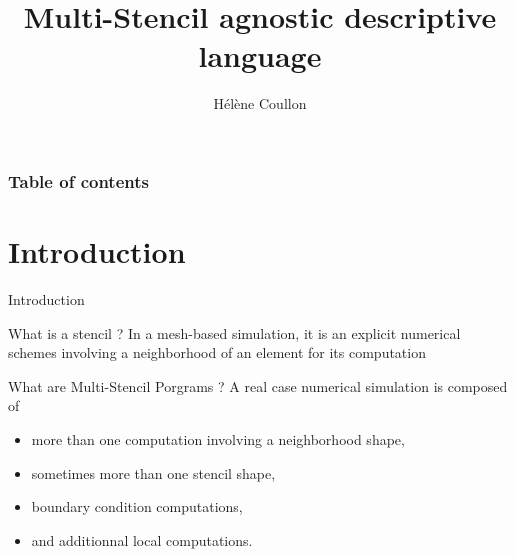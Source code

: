 \documentclass{beamer}
\title{Multi-Stencil agnostic descriptive language}
\author{Hélène Coullon}
\institute{INRIA}
\begin{document}
\begin{frame}
    \titlepage
\end{frame}

\begin{frame}
\frametitle{Table of contents}
    \tableofcontents[hideallsubsections]
\end{frame}

\section{Introduction}
\begin{frame}{Introduction}
\begin{block}{What is a stencil ?}
In a mesh-based simulation, it is an explicit numerical schemes involving a neighborhood of an element for its computation
\end{block}

\begin{block}{What are Multi-Stencil Porgrams ?}
A real case numerical simulation is composed of
\begin{itemize}
\item more than one computation involving a neighborhood shape,
\item sometimes more than one stencil shape,
\item boundary condition computations,
\item and additionnal local computations.
\end{itemize}
\end{block}

\end{frame}
\end{document}
